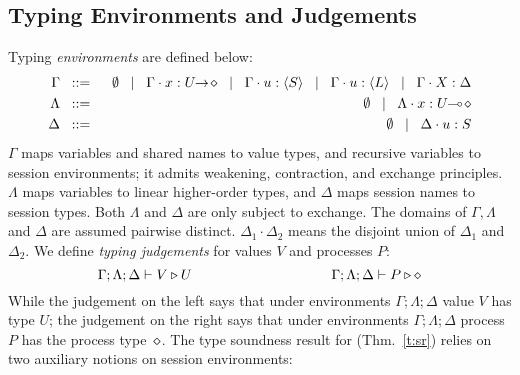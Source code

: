 \subsection{Typing Environments and Judgements}
\noi Typing \emph{environments} are defined below:
\begin{eqnarray*}
	\Gamma  & \;\;::=\;\;  &\emptyset \;\;\;|\;\;\; \Gamma \cdot x: U\!\! \rightarrow\! \diamond \;\;\;|\;\;\; \Gamma \cdot u: \langle S \rangle \;\;\;|\;\;\; \Gamma \cdot u: \langle L \rangle 
        \;\;\;|\;\;\; \Gamma \cdot X: \Delta \\
	\Lambda &\;\;::=\;\; & \emptyset \;\;\;|\;\;\; \Lambda \cdot x : U\!\! \multimap\! \diamond \\
	\Delta   &\;\;::=\;\; &  \emptyset \;\;\;|\;\;\; \Delta \cdot u : S
\end{eqnarray*}
\noi 
$\Gamma$ maps variables and shared names to value types, and recursive 
variables to session environments;  
it admits weakening, contraction, and exchange principles.
$\Lambda$ maps variables to 
 linear %
higher-order
types, and $\Delta$ maps
session names to session types. 
Both $\Lambda$ and $\Delta$ %
are
only subject to exchange.  
The domains of $\Gamma,
\Lambda$ and $\Delta$ are assumed pairwise distinct. 
$\Delta_1\cdot \Delta_2$ means 
the disjoint union of $\Delta_1$ and $\Delta_2$.  
We define \emph{typing judgements} for values $V$
and processes $P$:
	$$\Gamma; \Lambda; \Delta \vdash V \triangleright U \qquad \qquad \qquad \qquad \qquad \Gamma; \Lambda; \Delta \vdash P \triangleright \diamond$$
While the judgement on the left
says that under environments $\Gamma; \Lambda; \Delta$ value $V$
has type $U$; the  judgement on the right says that under
environments $\Gamma; \Lambda; \Delta$ process $P$ has the process type~$\diamond$.
The type soundness result for \HOp (Thm.~\ref{t:sr})
relies on two auxiliary notions on session environments: 


